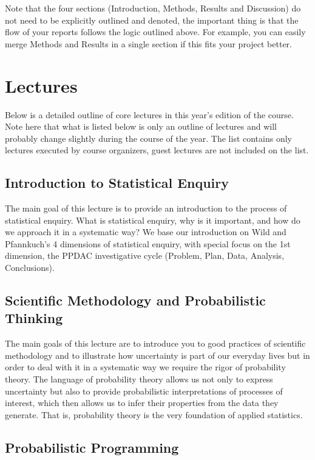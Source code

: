 \documentclass[fleqn,moreauthors,10pt]{ds_report}
\begin{document}
Note that the four sections (Introduction, Methods, Results and Discussion) do not need to be explicitly outlined and denoted, the important thing is that the flow of your reports follows the logic outlined above. For example, you can easily merge Methods and Results in a single section if this fits your project better.

\section*{Lectures}

Below is a detailed outline of core lectures in this year's edition of the course. Note here that what is listed below is only an outline of lectures and will probably change slightly during the course of the year. The list contains only lectures executed by course organizers, guest lectures are not included on the list.

\subsection*{Introduction to Statistical Enquiry}

The main goal of this lecture is to provide an introduction to the process of statistical enquiry. What is statistical enquiry, why is it important, and how do we approach it in a systematic way? We base our introduction on Wild and Pfannkuch’s 4 dimensions of statistical enquiry, with special focus on the 1st dimension, the PPDAC investigative cycle (Problem, Plan, Data, Analysis, Conclusions).

\subsection*{Scientific Methodology and Probabilistic Thinking}

The main goals of this lecture are to introduce you to good practices of scientific methodology and to illustrate how uncertainty is part of our everyday lives but in order to deal with it in a systematic way we require the rigor of probability theory. The language of probability theory allows us not only to express uncertainty but also to provide probabilistic interpretations of processes of interest, which then allows us to infer their properties from the data they generate. That is, probability theory is the very foundation of applied statistics.

\subsection*{Probabilistic Programming}
\end{document}
